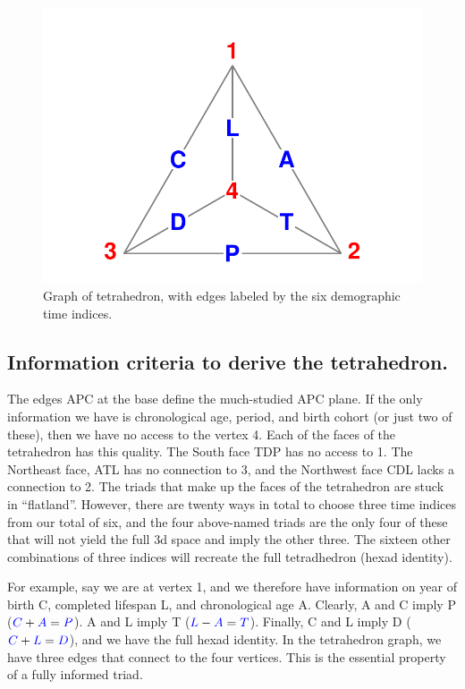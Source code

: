 \documentclass[11pt,oneside]{article} %
\newcommand\vt[1]{\textcolor{rd}{#1}}
\newcommand\eg[1]{\textcolor{bl}{#1}}
\begin{document}
\begin{figure}[h!]
\centering
\caption{Graph of tetrahedron, with edges labeled by the six demographic time
indices.}
\label{fig:tet}
\includegraphics[scale=1]{Figures/TetraHedronVerticesEdges.pdf}
\end{figure}

\subsection*{Information criteria to derive the tetrahedron.}
The edges \eg{APC} at the base define the much-studied \eg{APC} plane. If the only
information we have is chronological age, period, and birth cohort (or just two
of these), then we have no access to the vertex \vt{4}. Each of the faces of the
tetrahedron has this quality. The South face \eg{TDP} has no access to \vt{1}.
The Northeast face, \eg{ATL} has no connection to \vt{3}, and the Northwest face
\eg{CDL} lacks a connection to \vt{2}. The triads that make up the faces of
the tetrahedron are stuck in ``flatland''. However, there are twenty ways in
total to choose three time indices from our total of six, and the four
above-named triads are the only four of these that will not yield the full 3d
space and imply the other three. The sixteen other combinations of three indices will recreate the full tetradhedron (hexad identity).

For example, say we are at vertex \vt{1}, and we therefore have
information on year of birth \eg{C}, completed lifespan \eg{L}, and
chronological age \eg{A}. Clearly, \eg{A} and \eg{C} imply \eg{P}
($\eg{C}+\eg{A}=\eg{P}$).
\eg{A} and \eg{L} imply \eg{T} ($\eg{L}-\eg{A}=\eg{T}$). Finally, \eg{C} and
\eg{L} imply \eg{D} ($\eg{C}+\eg{L}=\eg{D}$), and we have the full hexad
identity. In the tetrahedron graph, we have three edges that connect to the
four vertices. This is the essential property of a fully informed triad.
\end{document}
